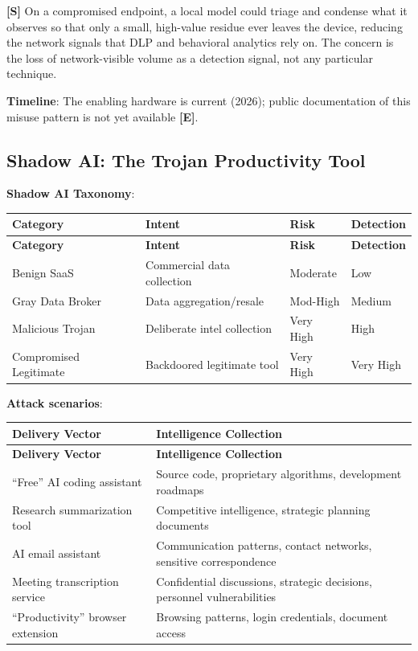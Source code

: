 \documentclass[11pt,letterpaper]{article}
\newcommand{\etraneed}[1]{\par\ifdim\pagegoal<\maxdimen\ifdim\pagetotal<\pagegoal\ifdim\dimexpr\pagegoal-\pagetotal\relax<\dimexpr#1\relax\newpage\fi\fi\fi}
\begin{document}
\begin{criticalbox}
\textbf{[S]} On a compromised endpoint, a local model could triage and condense what it observes so that only a small, high-value residue ever leaves the device, reducing the network signals that DLP and behavioral analytics rely on. The concern is the loss of network-visible volume as a detection signal, not any particular technique.

\textbf{Timeline}: The enabling hardware is current (2026); public documentation of this misuse pattern is not yet available \textbf{[E]}.
\end{criticalbox}

\subsection{Shadow AI: The Trojan Productivity Tool}

\textbf{Shadow AI Taxonomy}:

{\small
\begin{longtable}{L{2.5cm}L{4.5cm}L{2cm}L{2cm}}
\toprule
\textbf{Category} & \textbf{Intent} & \textbf{Risk} & \textbf{Detection} \\
\midrule
\endfirsthead
\toprule
\textbf{Category} & \textbf{Intent} & \textbf{Risk} & \textbf{Detection} \\
\midrule
\endhead
Benign SaaS & Commercial data collection & Moderate & Low \\*
Gray Data Broker & Data aggregation/resale & Mod-High & Medium \\
Malicious Trojan & Deliberate intel collection & Very High & High \\*
Compromised Legitimate & Backdoored legitimate tool & Very High & Very High \\
\bottomrule
\end{longtable}}

\etraneed{12\baselineskip}
\textbf{Attack scenarios}:

{\small
\begin{longtable}{L{4.5cm}L{8cm}}
\toprule
\textbf{Delivery Vector} & \textbf{Intelligence Collection} \\
\midrule
\endfirsthead
\toprule
\textbf{Delivery Vector} & \textbf{Intelligence Collection} \\
\midrule
\endhead
``Free'' AI coding assistant & Source code, proprietary algorithms, development roadmaps \\*
Research summarization tool & Competitive intelligence, strategic planning documents \\
AI email assistant & Communication patterns, contact networks, sensitive correspondence \\
Meeting transcription service & Confidential discussions, strategic decisions, personnel vulnerabilities \\*
``Productivity'' browser extension & Browsing patterns, login credentials, document access \\
\bottomrule
\end{longtable}}
\end{document}
